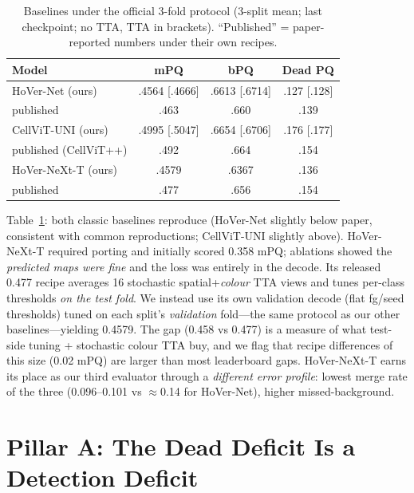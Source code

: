 \documentclass[11pt]{article}
\begin{document}
\begin{table}[t]
\centering\small
\caption{Baselines under the official 3-fold protocol (3-split mean; last checkpoint; no TTA,
TTA in brackets). ``Published'' = paper-reported numbers under their own recipes.}
\label{tab:baselines}
\begin{tabular}{lccc}
\toprule
Model & mPQ & bPQ & Dead PQ \\
\midrule
HoVer-Net (ours)            & .4564 [.4666] & .6613 [.6714] & .127 [.128] \\
\quad published             & .463 & .660 & .139 \\
CellViT-UNI (ours)          & .4995 [.5047] & .6654 [.6706] & .176 [.177] \\
\quad published (CellViT++) & .492 & .664 & .154 \\
HoVer-NeXt-T (ours)         & .4579 & .6367 & .136 \\
\quad published             & .477 & .656 & .154 \\
\bottomrule
\end{tabular}
\end{table}

Table~\ref{tab:baselines}: both classic baselines reproduce (HoVer-Net slightly below paper,
consistent with common reproductions; CellViT-UNI slightly above). HoVer-NeXt-T required
porting and initially scored 0.358 mPQ; ablations showed the \emph{predicted maps were fine}
and the loss was entirely in the decode. Its released 0.477 recipe averages 16 stochastic
spatial+\emph{colour} TTA views and tunes per-class thresholds \emph{on the test fold}. We
instead use its own validation decode (flat fg/seed thresholds) tuned on each split's
\emph{validation} fold---the same protocol as our other baselines---yielding 0.4579. The gap
(0.458 vs 0.477) is a measure of what test-side tuning + stochastic colour TTA buy, and we flag
that recipe differences of this size (0.02 mPQ) are larger than most leaderboard gaps.
HoVer-NeXt-T earns its place as our third evaluator through a \emph{different error profile}:
lowest merge rate of the three (0.096--0.101 vs $\approx$0.14 for HoVer-Net), higher
missed-background.

\section{Pillar A: The Dead Deficit Is a Detection Deficit}
\label{sec:pillarA}
\end{document}
